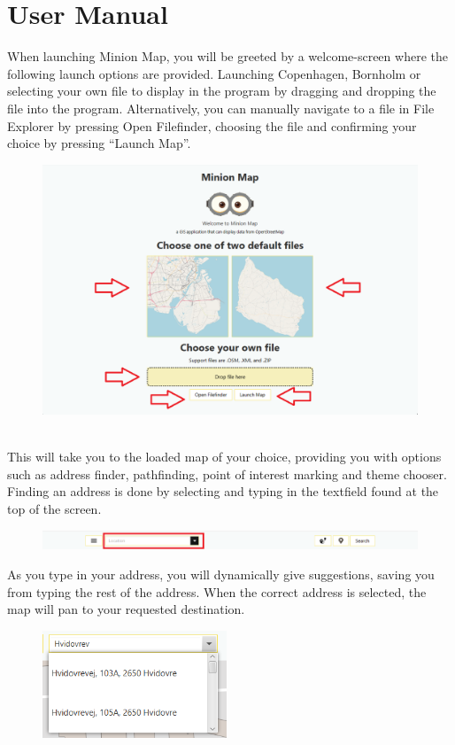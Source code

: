 \section{User Manual}
When launching Minion Map, you will be greeted by a welcome-screen where the following launch options are provided. Launching Copenhagen, Bornholm or selecting your own file to display in the program by dragging and dropping the file into the program. Alternatively, you can manually navigate to a file in File Explorer by pressing Open Filefinder, choosing the file and confirming your choice by pressing “Launch Map”.
\begin{figure}[ht]%
  \centering
  \includegraphics[width=14.5cm]{docs/material/UserManual_Start.png}%
\end{figure}\\
This will take you to the loaded map of your choice, providing you with options such as address finder, pathfinding, point of interest marking and theme chooser. 
Finding an address is done by selecting and typing in the textfield found at the top of the screen.
\begin{figure}[ht]%
  \centering
  \includegraphics[width=14.5cm]{docs/material/UserManual_AddressSearch.png}%
\end{figure}
\newpage
As you type in your address, you will dynamically give suggestions, saving you from typing the rest of the address. When the correct address is selected, the map will pan to your requested destination. 
\begin{figure}[ht]%
  \centering
  \includegraphics[width=5.5cm]{docs/material/AddressSearchDropdown1.png}%
\end{figure}\\
